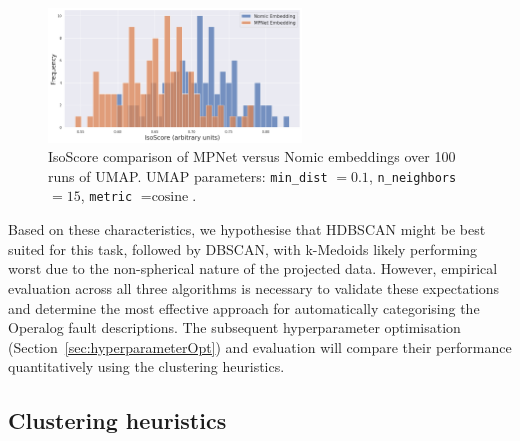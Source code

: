 \documentclass[10pt,oneside]{report}
\begin{document}
\begin{figure}[htbp]
    \centering
    \includegraphics[width=0.6\textwidth]{./images/isoscore.png}
    \caption{IsoScore comparison of MPNet versus Nomic embeddings over 100 runs of UMAP. UMAP parameters: \texttt{min\_dist} $=0.1$, \texttt{n\_neighbors} $=15$, \texttt{metric} $= \text{cosine}$.}\label{fig:isoscore}
\end{figure}

Based on these characteristics, we hypothesise that HDBSCAN might be best suited for this task, followed by DBSCAN, with k-Medoids likely performing worst due to the non-spherical nature of the projected data. However, empirical evaluation across all three algorithms is necessary to validate these expectations and determine the most effective approach for automatically categorising the Operalog fault descriptions. The subsequent hyperparameter optimisation (Section~\ref{sec:hyperparameterOpt}) and evaluation will compare their performance quantitatively using the clustering heuristics.

\subsection{Clustering heuristics} \label{sec:clusterheuristics}
\end{document}
